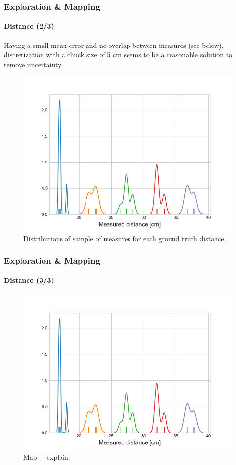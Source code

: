 \documentclass[10pt]{beamer}
\begin{document}

\begin{frame}
\frametitle{Exploration \& Mapping}
\framesubtitle{Distance (2/3)}
Having a small mean error and no overlap between measures (see below), discretization with a chuck size of 5 cm seems to be a reasonable solution to remove uncertainty.
\vspace*{-2mm}
\begin{figure}[hbtp]
\centering
\includegraphics[scale=0.45]{figures/distrib.png}
\vspace*{-2mm}
\caption{Distributions of sample of measures for each ground truth distance.}
\label{fig:distrib-dist}
\end{figure}
\end{frame}


\begin{frame}
\frametitle{Exploration \& Mapping}
\framesubtitle{Distance (3/3)}
\vspace*{-4mm}
\begin{figure}[hbtp]
\centering
\includegraphics[scale=0.45]{figures/distrib.png}
\vspace*{-2mm}
\caption{Map + explain.}
\label{fig:map}
\end{figure}
\end{frame}
\end{document}
